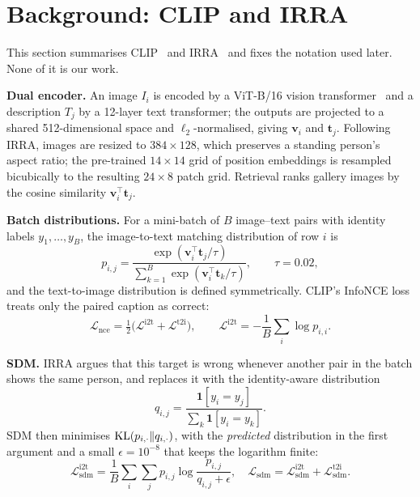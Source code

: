\section{Background: CLIP and IRRA \tagE}\label{sec:background}

This section summarises CLIP~\cite{radford2021learningtransferablevisualmodels} and IRRA~\cite{jiang2023crossmodalimplicitrelationreasoning} and fixes the notation used later. None of it is our work.

\textbf{Dual encoder.} An image $I_i$ is encoded by a ViT-B/16 vision transformer~\cite{dosovitskiy2021imageworth16x16words} and a description $T_j$ by a 12-layer text transformer; the outputs are projected to a shared 512-dimensional space and $\ell_2$-normalised, giving $\mathbf{v}_i$ and $\mathbf{t}_j$. Following IRRA, images are resized to $384{\times}128$, which preserves a standing person's aspect ratio; the pre-trained $14{\times}14$ grid of position embeddings is resampled bicubically to the resulting $24{\times}8$ patch grid. Retrieval ranks gallery images by the cosine similarity $\mathbf{v}_i^{\top}\mathbf{t}_j$.

\textbf{Batch distributions.} For a mini-batch of $B$ image--text pairs with identity labels $y_1,\dots,y_B$, the image-to-text matching distribution of row $i$ is
\begin{equation}
p_{i,j}=\frac{\exp(\mathbf{v}_i^{\top}\mathbf{t}_j/\tau)}{\sum_{k=1}^{B}\exp(\mathbf{v}_i^{\top}\mathbf{t}_k/\tau)},\qquad \tau=0.02,\label{eq:p}
\end{equation}
and the text-to-image distribution is defined symmetrically. CLIP's InfoNCE loss treats only the paired caption as correct:
\begin{equation}
\mathcal{L}_{\mathrm{nce}}=\tfrac12\big(\mathcal{L}^{\mathrm{i2t}}+\mathcal{L}^{\mathrm{t2i}}\big),\qquad \mathcal{L}^{\mathrm{i2t}}=-\frac1B\sum_{i}\log p_{i,i}.\label{eq:nce}
\end{equation}

\textbf{SDM.} IRRA argues that this target is wrong whenever another pair in the batch shows the same person, and replaces it with the identity-aware distribution
\begin{equation}
q_{i,j}=\frac{\mathbf{1}[y_i=y_j]}{\sum_{k}\mathbf{1}[y_i=y_k]}.\label{eq:q}
\end{equation}
SDM then minimises $\operatorname{KL}(p_{i,\cdot}\Vert q_{i,\cdot})$, with the \emph{predicted} distribution in the first argument and a small $\epsilon=10^{-8}$ that keeps the logarithm finite:
\begin{equation}
\mathcal{L}^{\mathrm{i2t}}_{\mathrm{sdm}}=\frac1B\sum_{i}\sum_{j}p_{i,j}\log\frac{p_{i,j}}{q_{i,j}+\epsilon},\quad \mathcal{L}_{\mathrm{sdm}}=\mathcal{L}^{\mathrm{i2t}}_{\mathrm{sdm}}+\mathcal{L}^{\mathrm{t2i}}_{\mathrm{sdm}}.\label{eq:sdm}
\end{equation}

